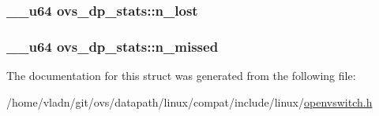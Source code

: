 \subsubsection[{n\+\_\+lost}]{\setlength{\rightskip}{0pt plus 5cm}\+\_\+\+\_\+u64 ovs\+\_\+dp\+\_\+stats\+::n\+\_\+lost}\label{structovs__dp__stats_a83a104dedcf4ee3cc2a940e4043e89b2}
\hypertarget{structovs__dp__stats_a8f1b9687593ebb43ca54c1c9904999a6}{}
\subsubsection[{n\+\_\+missed}]{\setlength{\rightskip}{0pt plus 5cm}\+\_\+\+\_\+u64 ovs\+\_\+dp\+\_\+stats\+::n\+\_\+missed}\label{structovs__dp__stats_a8f1b9687593ebb43ca54c1c9904999a6}


The documentation for this struct was generated from the following file\+:\begin{DoxyCompactItemize}
\item 
/home/vladn/git/ovs/datapath/linux/compat/include/linux/\hyperlink{openvswitch_8h}{openvswitch.\+h}\end{DoxyCompactItemize}

